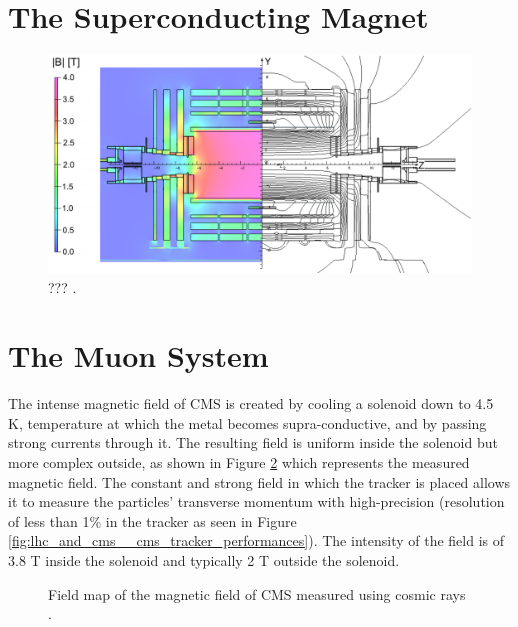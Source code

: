   \section{The Superconducting Magnet}

    \begin{figure}[h!]
      \centering
      \includegraphics[width=\textwidth]{img/I-3-cms/magnet.png}
      \caption{??? \cite{Chatrchyan:2009si}.}
      \label{fig:I-3-cms-magnet}
    \end{figure}

  \section{The Muon System}


  			The intense magnetic field of CMS is created by cooling a solenoid down to 4.5 K, temperature at which the metal becomes supra-conductive, and by passing strong currents through it. The resulting field is uniform inside the solenoid but more complex outside, as shown in Figure \ref{fig:lhc_and_cms__cms_magnetic_field} which represents the measured magnetic field. The constant and strong field in which the tracker is placed allows it to measure the particles' transverse momentum with high-precision (resolution of less than 1\% in the tracker as seen in Figure \ref{fig:lhc_and_cms__cms_tracker_performances}). The intensity of the field is of 3.8 T inside the solenoid and typically 2 T outside the solenoid. \\

  			\begin{figure}[h!]
  				\centering
  				\caption{Field map of the magnetic field of CMS measured using cosmic rays \Cite{CMS_B_Field}.}
  				\label{fig:lhc_and_cms__cms_magnetic_field}
  			\end{figure}

